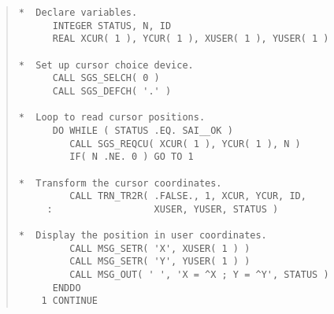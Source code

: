 \begin{quote}
\begin{tabbing} %

\verb#*  Declare variables.                                  #\\
\verb#      INTEGER STATUS, N, ID                            #\\
\verb#      REAL XCUR( 1 ), YCUR( 1 ), XUSER( 1 ), YUSER( 1 )#\\
\verb#                                                       #\\
\verb#*  Set up cursor choice device.                        #\\
\verb#      CALL SGS_SELCH( 0 )                              #\\
\verb#      CALL SGS_DEFCH( '.' )                            #\\
\verb#                                                       #\\
\verb#*  Loop to read cursor positions.                      #\\
\verb#      DO WHILE ( STATUS .EQ. SAI__OK )                 #\\
\verb#         CALL SGS_REQCU( XCUR( 1 ), YCUR( 1 ), N )     #\\
\verb#         IF( N .NE. 0 ) GO TO 1                        #\\
\verb#                                                       #\\
\verb#*  Transform the cursor coordinates.                   #\\
\verb#         CALL TRN_TR2R( .FALSE., 1, XCUR, YCUR, ID,    #\\
\verb#     :                  XUSER, YUSER, STATUS )         #\\
\verb#                                                       #\\
\verb#*  Display the position in user coordinates.           #\\
\verb#         CALL MSG_SETR( 'X', XUSER( 1 ) )              #\\
\verb#         CALL MSG_SETR( 'Y', YUSER( 1 ) )              #\\
\verb#         CALL MSG_OUT( ' ', 'X = ^X ; Y = ^Y', STATUS )#\\
\verb#      ENDDO                                            #\\
\verb#    1 CONTINUE                                         #\\

\end{tabbing}
\end{quote}

